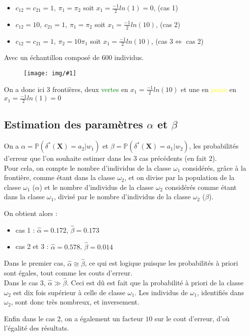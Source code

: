 \documentclass[a4paper,11pt]{article}
\newcommand{\InsertFig}[1]{
\begin{figure}[H]
\begin{center}
\texttt{[image: img/\#1]}
\end{center}
\end{figure}}
\begin{document}
\begin{itemize}
\item $c_{12} = c_{21} = 1, \ \pi_1 = \pi_2$ soit $x_1 = \frac{-1}{2} ln(1) = 0$, (cas 1)\\
\item $c_{12} = 10, \ c_{21} = 1, \ \pi_1 = \pi_2$ soit $x_1 = \frac{-1}{2} ln(10)$, (cas 2) \\
\item $c_{12} = c_{21} = 1, \ \pi_2 = 10\pi_1$ soit $x_1 = \frac{-1}{2} ln(10)$, (cas 3$\Leftrightarrow$ cas 2)\\
\end{itemize} 

\noindent Avec un échantillon composé de $600$ individus.

\InsertFig{front}

\noindent On a donc ici 3 frontières, deux \textcolor{green}{vertes} en $x_1 = \frac{-1}{2} ln(10)$ et une en \textcolor{yellow}{jaune} en $x_1 = \frac{-1}{2} ln(1) = 0$

\subsection{Estimation des paramètres $\alpha$ et $\beta$}

\noindent On a $\alpha = \mathbb{P}(\delta^*(\textbf{X}) = a_2 |w_1)$ et $\beta = \mathbb{P}(\delta^*(\textbf{X}) = a_1 |w_2)$, les probabilités d'erreur que l'on souhaite estimer dans les $3$ cas précédents (en fait $2$). \\

\noindent Pour cela, on compte le nombre d'individus de la classe $\omega_1$ considérés, grâce à la frontière, comme étant dans la classe $\omega_2$, et on divise par la population de la classe $\omega_1$ ($\alpha$) et le nombre d'individus de la classe $\omega_2$ considérés comme étant dans la classe $\omega_1$, divisé par le nombre d'individus de la classe $\omega_2$ ($\beta$).

\noindent On obtient alors :  \\

\begin{itemize}
\item cas 1 : $\hat\alpha = 0.172$, $\hat\beta = 0.173$\\
\item cas 2 et 3 : $\hat\alpha = 0.578$, $\hat\beta = 0.014$\\
\end{itemize} 

\noindent Dans le premier cas, $\hat\alpha \cong \hat\beta$, ce qui est logique puisque les probabilités à priori sont égales, tout comme les couts d'erreur. \\

\noindent  Dans le cas 3,  $\hat\alpha \gg \hat\beta$. Ceci est dû est fait que la probabilité à priori de la classe $\omega_2$ est dix fois supérieur à celle de classe $\omega_1$. Les individus de $\omega_1$, identifiés dans $\omega_2$, sont donc très nombreux, et inversement.

\noindent Enfin dans le cas 2, on a également un facteur $10$ sur le cout d'erreur, d'où l'égalité des résultats.
\end{document}
